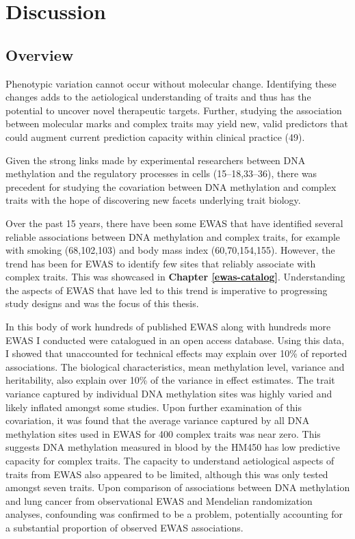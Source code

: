 \documentclass[11pt,oneside]{bristolthesis}
\begin{document}
\hypertarget{discussion-thesis}{%
\chapter{Discussion}\label{discussion-thesis}}

\hypertarget{overview-08}{%
\section{Overview}\label{overview-08}}

Phenotypic variation cannot occur without molecular change. Identifying these changes adds to the aetiological understanding of traits and thus has the potential to uncover novel therapeutic targets. Further, studying the association between molecular marks and complex traits may yield new, valid predictors that could augment current prediction capacity within clinical practice (49).

Given the strong links made by experimental researchers between DNA methylation and the regulatory processes in cells (15--18,33--36), there was precedent for studying the covariation between DNA methylation and complex traits with the hope of discovering new facets underlying trait biology.

Over the past 15 years, there have been some EWAS that have identified several reliable associations between DNA methylation and complex traits, for example with smoking (68,102,103) and body mass index (60,70,154,155). However, the trend has been for EWAS to identify few sites that reliably associate with complex traits. This was showcased in \textbf{Chapter \ref{ewas-catalog}}. Understanding the aspects of EWAS that have led to this trend is imperative to progressing study designs and was the focus of this thesis.

In this body of work hundreds of published EWAS along with hundreds more EWAS I conducted were catalogued in an open access database. Using this data, I showed that unaccounted for technical effects may explain over 10\% of reported associations. The biological characteristics, mean methylation level, variance and heritability, also explain over 10\% of the variance in effect estimates. The trait variance captured by individual DNA methylation sites was highly varied and likely inflated amongst some studies. Upon further examination of this covariation, it was found that the average variance captured by all DNA methylation sites used in EWAS for 400 complex traits was near zero. This suggests DNA methylation measured in blood by the HM450 has low predictive capacity for complex traits. The capacity to understand aetiological aspects of traits from EWAS also appeared to be limited, although this was only tested amongst seven traits. Upon comparison of associations between DNA methylation and lung cancer from observational EWAS and Mendelian randomization analyses, confounding was confirmed to be a problem, potentially accounting for a substantial proportion of observed EWAS associations.
\end{document}

